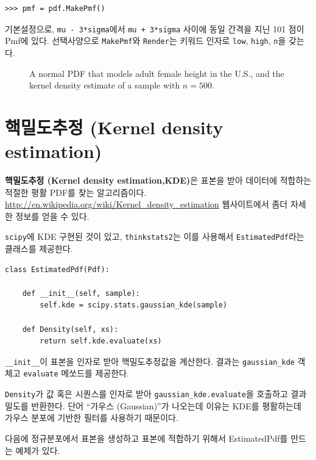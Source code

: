 \begin{verbatim}
>>> pmf = pdf.MakePmf()
\end{verbatim}

기본설정으로, {\tt mu - 3*sigma}에서 {\tt mu + 3*sigma} 사이에 동일 간격을 지닌 101 점이 Pmf에 있다.
선택사양으로 {\tt MakePmf}와 {\tt Render}는 키워드 인자로 {\tt low}, {\tt high}, {\tt n}을 갖는다.

\begin{figure}
\caption{A normal PDF that models adult female height in the U.S.,
and the kernel density estimate of a sample with $n=500$.}
\label{pdf_example}
\end{figure}


\section{핵밀도추정 (Kernel density estimation)} 

{\bf 핵밀도추정 (Kernel density estimation,KDE)}은
표본을 받아 데이터에 적합하는 적절한 평활 PDF를 찾는 알고리즘이다.
\url{http://en.wikipedia.org/wiki/Kernel_density_estimation}  웹사이트에서 좀더 자세한 정보를 얻을 수 있다.


{\tt scipy}에 KDE 구현된 것이 있고, 
{\tt thinkstats2}는 이를 사용해서 {\tt EstimatedPdf}라는 클래스를 제공한다.

\begin{verbatim}
class EstimatedPdf(Pdf):

    def __init__(self, sample):
        self.kde = scipy.stats.gaussian_kde(sample)

    def Density(self, xs):
        return self.kde.evaluate(xs)
\end{verbatim}

\verb"__init__"이 표본을 인자로 받아 핵밀도추정값을 계산한다.
결과는 \verb"gaussian_kde" 객체고 {\tt evaluate} 메쏘드를 제공한다.

{\tt Density}가 값 혹은 시퀀스를 인자로 받아 
\verb"gaussian_kde.evaluate"을 호출하고 결과 밀도를 반환한다.
단어 ``가우스 (Gaussian)''가 나오는데 이유는 KDE를 평활하는데 가우스 분포에 기반한 필터를 사용하기 때문이다.

다음에 정규분포에서 표본을 생성하고 표본에 적합하기 위해서 EstimatedPdf를 만드는 예제가 있다.

